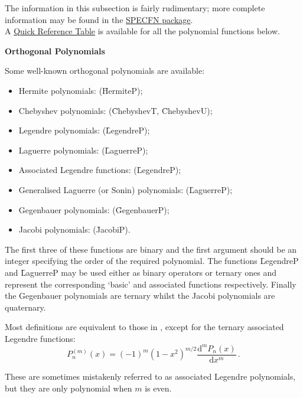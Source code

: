 The information in this subsection is fairly rudimentary; more complete
information may be found in the \hyperlink{POLYFN}{SPECFN package}.\\
A \hyperlink{SPECFNTAB3}{Quick Reference Table} is available for all the
polynomial functions below.

\textbf{Orthogonal Polynomials}
 

Some well-known orthogonal polynomials are available:
\begin{itemize}
\item Hermite polynomials: (\f{HermiteP});
\item Chebyshev polynomials: (\f{ChebyshevT}, \f{ChebyshevU});
\item Legendre polynomials: (\f{LegendreP});
\item Laguerre polynomials: (\f{LaguerreP});
\item Associated Legendre functions: (\f{LegendreP});
\item Generalised Laguerre (or Sonin) polynomials: (\f{LaguerreP});
\item Gegenbauer polynomials: (\f{GegenbauerP});
\item Jacobi polynomials: (\f{JacobiP}).
\end{itemize}
The first three of these functions are binary and the first
argument should be an integer specifying the order of the
required polynomial. The functions \f{LegendreP} and \f{LaguerreP} may be used
either as binary operators or ternary ones and represent the corresponding
`basic' and associated functions respectively.
Finally the Gegenbauer polynomials are ternary whilst the Jacobi polynomials
are quaternary.

Most definitions are equivalent to those in \cite{AbramowitzStegun:72},
except for the ternary associated Legendre functions:
\[P_n^{(m)}(x) = (-1)^m(1-x^2)^{m/2}\frac{\mathrm{d}^m P_n(x)}{\mathrm{d}x^m}\,.\]

These are sometimes mistakenly referred to as associated Legendre polynomials,
but they are only polynomial when $m$ is even.

